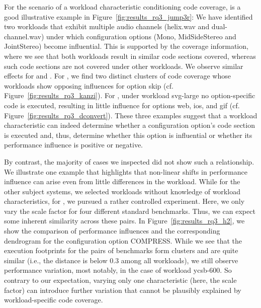 For the scenario of a workload characteristic conditioning code coverage, \jumper is a good illustrative example in Figure~\ref{fig:results_rq3_jump3r}: We have identified two workloads that exhibit multiple audio channels (\textsf{helix.wav} and \textsf{dual-channel.wav}) under which configuration options (\textsf{Mono, MidSideStereo and JointStereo}) become influential. This is supported by the coverage information, where we see that both workloads result in similar code sections covered, whereas such code sections are not covered under other workloads. We observe similar effects for \kanzi and \dconvert. For \kanzi, we find two distinct clusters of code coverage whose workloads show opposing influences for option \textsf{skip} (cf. Figure~\ref{fig:results_rq3_kanzi}). For \dconvert, under workload \textsf{svg-large} no option-specific code is executed, resulting in little influence for options \textsf{web, ios, and gif} (cf. Figure~\ref{fig:results_rq3_dconvert}). These three examples suggest that a workload characteristic can indeed determine whether a configuration option's code section is executed and, thus, determine whether this option is influential or whether its performance influence is positive or negative. 

By contrast, the majority of cases we inspected did not show such a relationship. We illustrate one example that highlights that non-linear shifts in performance influence can arise even from little differences in the workload. While for the other subject systems, we selected workloads without knowledge of workload characteristics, for \htwo, we pursued a rather controlled experiment. Here, we only vary the scale factor for four different standard benchmarks. Thus, we can expect some inherent similarity across these pairs. In Figure~\ref{fig:results_rq3_h2}, we show the comparison of performance influences and the corresponding dendrogram for the configuration option \textsf{COMPRESS}. While we see that the execution footprints for the pairs of benchmarks form clusters and are quite similar (i.e., the distance is below 0.3 among all workloads), we still observe performance variation, most notably, in the case of workload \textsf{ycsb-600}. So contrary to our expectation, varying only one characteristic (here, the scale factor) can introduce further variation that cannot be plausibly explained by workload-specific code coverage. 


